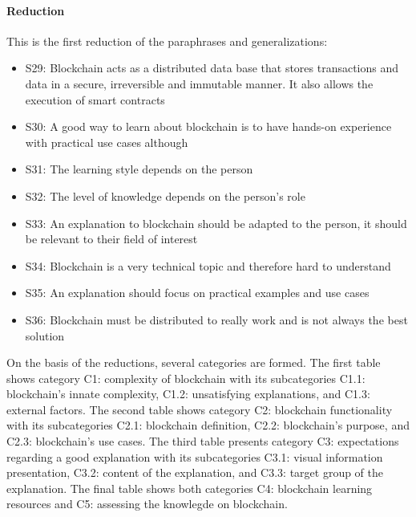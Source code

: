 \paragraph{Reduction} This is the first reduction of the paraphrases and generalizations: 
\begin{itemize}
    \item S29: Blockchain acts as a distributed data base that stores transactions and data in a secure, irreversible and immutable manner. It also allows the execution of smart contracts
    \item S30: A good way to learn about blockchain is to have hands-on experience with practical use cases although
    \item S31: The learning style depends on the person
    \item S32: The level of knowledge depends on the person's role
    \item S33: An explanation to blockchain should be adapted to the person, it should be relevant to their field of interest
    \item S34: Blockchain is a very technical topic and therefore hard to understand
    \item S35: An explanation should focus on practical examples and use cases
    \item S36: Blockchain must be distributed to really work and is not always the best solution
\end{itemize}

 \label{Anhang Teil Mayring Kategoriensystem}
On the basis of the reductions, several categories are formed. The first table shows category C1: complexity of blockchain with its subcategories C1.1: blockchain's innate complexity, C1.2: unsatisfying explanations, and C1.3: external factors. The second table shows category C2: blockchain functionality with its subcategories C2.1: blockchain definition, C2.2: blockchain's purpose, and C2.3: blockchain's use cases. The third table presents category C3: expectations regarding a good explanation with its subcategories C3.1: visual information presentation, C3.2: content of the explanation, and C3.3: target group of the explanation.  The final table shows both categories C4: blockchain learning resources and C5: assessing the knowlegde on blockchain.

